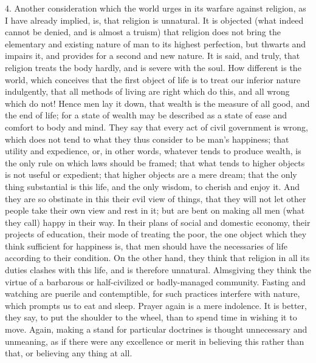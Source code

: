 4. Another consideration which the world urges in its warfare
against religion, as I have already implied, is, that religion is
unnatural. It is objected (what indeed cannot be denied, and is almost
a truism) that religion does not bring the elementary and existing
nature of man to its highest perfection, but thwarts and impairs it,
and provides for a second and new nature. It is said, and truly, that
religion treats the body hardly, and is severe with the soul. How
different is the world, which conceives that the first object of life
is to treat our inferior nature indulgently, that all methods of
living are right which do this, and all wrong which do not! Hence men
lay it down, that wealth is the measure of all good, and the end of
life; for a state of wealth may be described as a state of ease and
comfort to body and mind. They say that every act of civil government
is wrong, which does not tend to what they thus consider to be man's
happiness; that utility and expedience, or, in other words, whatever
tends to produce wealth, is the only rule on which laws should be
framed; that what tends to higher objects is not useful or expedient;
that higher objects are a mere dream; that the only thing substantial
is this life, and the only wisdom, to cherish and enjoy it. And they
are so obstinate in this their evil view of things, that they will not
let other people take their own view and rest in it; but are bent on
making all men (what they call) happy in their way. In their plans of
social and domestic economy, their projects of education, their mode
of treating the poor, the one object which they think sufficient for
happiness is, that men should have the necessaries of life according
to their condition. On the other hand, they think that religion in all
its duties clashes with this life, and is therefore unnatural.
Almsgiving they think the virtue of a barbarous or half-civilized or
badly-managed community. Fasting and watching are puerile and
contemptible, for such practices interfere with nature, which prompts
us to eat and sleep. Prayer again is a mere indolence. It is better,
they say, to put the shoulder to the wheel, than to spend time in
wishing it to move. Again, making a stand for particular doctrines is
thought unnecessary and unmeaning, as if there were any excellence or
merit in believing this rather than that, or believing any thing at
all.

